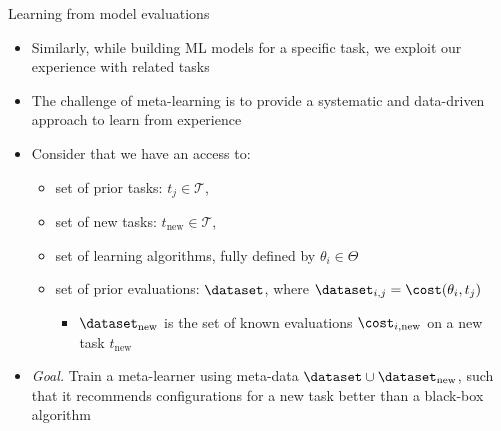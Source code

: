 
\begin{frame}[c]{Learning from model evaluations}

\begin{itemize}
    \item Similarly, while building ML models for a specific task, we exploit our experience with related tasks
    \item The challenge of meta-learning is to provide a systematic and data-driven approach to learn from experience 
    \item Consider that we have an access to:
        \begin{itemize}
            \item set of prior tasks: $t_{j} \in \mathcal{T}$,
            \item set of new tasks: $t_{\text{new}} \in \mathcal{T}$,
            \item set of learning algorithms, fully defined by $\theta_{i} \in \Theta$
            \item set of prior evaluations: $\dataset$, where $\dataset_{i, j} = \cost(\theta_{i}, t_{j})$
            \begin{itemize}
                \item $\dataset_{\text{new}}$ is the set of known evaluations $\cost_{i, \text{new}}$ on a new task $t_{\text{new}}$
            \end{itemize}
        \end{itemize}
    \item \emph{Goal.} Train a meta-learner using meta-data $\dataset \cup \dataset_{\text{new}}$, such that it recommends configurations for a new task better than a black-box algorithm
\end{itemize}

\hspace{11cm}

\end{frame}

